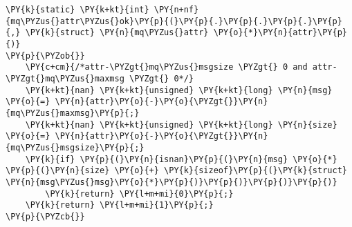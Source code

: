 \begin{Verbatim}[commandchars=\\\{\},codes={\catcode`\$=3\catcode`\^=7\catcode`\_=8}]
\PY{k}{static} \PY{k+kt}{int} \PY{n+nf}{mq\PYZus{}attr\PYZus{}ok}\PY{p}{(}\PY{p}{.}\PY{p}{.}\PY{p}{.}\PY{p}{,} \PY{k}{struct} \PY{n}{mq\PYZus{}attr} \PY{o}{*}\PY{n}{attr}\PY{p}{)}
\PY{p}{\PYZob{}}
    \PY{c+cm}{/*attr-\PYZgt{}mq\PYZus{}msgsize \PYZgt{} 0 and attr-\PYZgt{}mq\PYZus{}maxmsg \PYZgt{} 0*/}
    \PY{k+kt}{nan} \PY{k+kt}{unsigned} \PY{k+kt}{long} \PY{n}{msg} \PY{o}{=} \PY{n}{attr}\PY{o}{-}\PY{o}{\PYZgt{}}\PY{n}{mq\PYZus{}maxmsg}\PY{p}{;}
    \PY{k+kt}{nan} \PY{k+kt}{unsigned} \PY{k+kt}{long} \PY{n}{size} \PY{o}{=} \PY{n}{attr}\PY{o}{-}\PY{o}{\PYZgt{}}\PY{n}{mq\PYZus{}msgsize}\PY{p}{;}
    \PY{k}{if} \PY{p}{(}\PY{n}{isnan}\PY{p}{(}\PY{n}{msg} \PY{o}{*} \PY{p}{(}\PY{n}{size} \PY{o}{+} \PY{k}{sizeof}\PY{p}{(}\PY{k}{struct} \PY{n}{msg\PYZus{}msg}\PY{o}{*}\PY{p}{)}\PY{p}{)}\PY{p}{)}\PY{p}{)}
        \PY{k}{return} \PY{l+m+mi}{0}\PY{p}{;}
    \PY{k}{return} \PY{l+m+mi}{1}\PY{p}{;}
\PY{p}{\PYZcb{}}
\end{Verbatim}
